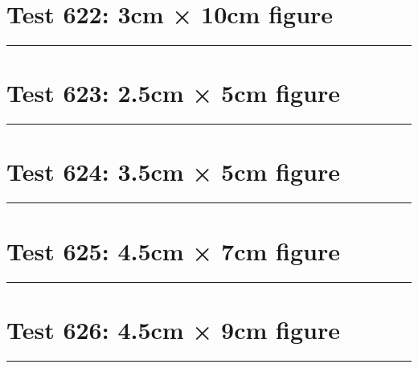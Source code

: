 \documentclass[a4paper,11pt]{article}
\begin{document}
\section*{Test 622: 3cm × 10cm figure}
\begin{swarmwrap}%
  \begin{minipage}[t]{3cm}
    \centering
    \rule{\linewidth}{10cm}
  \end{minipage}%
\end{swarmwrap}%
\swarmwrapnext
\lipsum[77]
\lipsum[78]
\lipsum[79]
\lipsum[80]
\lipsum[81]
\lipsum[82]
\section*{Test 623: 2.5cm × 5cm figure}
\begin{swarmwrap}%
  \begin{minipage}[t]{2cm}
    \centering
    \rule{\linewidth}{5cm}
  \end{minipage}%
\end{swarmwrap}%
\swarmwrapnext
\lipsum[60]
\lipsum[61]
\lipsum[62]
\lipsum[63]
\lipsum[64]
\section*{Test 624: 3.5cm × 5cm figure}
\begin{swarmwrap}%
  \begin{minipage}[t]{3cm}
    \centering
    \rule{\linewidth}{5cm}
  \end{minipage}%
\end{swarmwrap}%
\swarmwrapnext
\lipsum[142]
\lipsum[143]
\lipsum[144]
\lipsum[145]
\lipsum[146]
\lipsum[147]
\section*{Test 625: 4.5cm × 7cm figure}
\begin{swarmwrap}%
  \begin{minipage}[t]{4cm}
    \centering
    \rule{\linewidth}{7cm}
  \end{minipage}%
\end{swarmwrap}%
\swarmwrapnext
\lipsum[127]
\lipsum[128]
\lipsum[129]
\lipsum[130]
\lipsum[131]
\section*{Test 626: 4.5cm × 9cm figure}
\begin{swarmwrap}%
  \begin{minipage}[t]{4cm}
    \centering
    \rule{\linewidth}{9cm}
  \end{minipage}%
\end{swarmwrap}%
\swarmwrapnext
\lipsum[45]
\lipsum[46]
\lipsum[47]
\lipsum[48]
\lipsum[49]
\lipsum[50]
\end{document}
